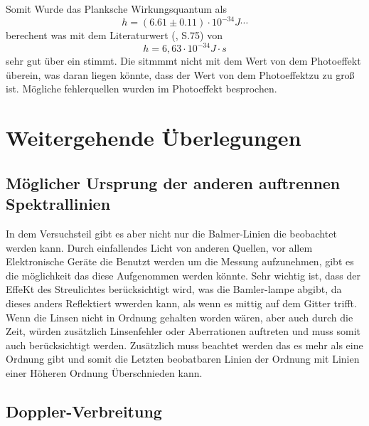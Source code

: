 Somit Wurde das Planksche Wirkungsquantum als
\begin{equation}
    h = (6.61 \pm 0.11)\cdot 10^{-34} J\cdots
\end{equation}
berechent was mit dem Literaturwert (\cite{Demtröder_Ex3}, S.75) von
\begin{equation}
    h = 6,63 \cdot10^{-34} J\cdot s
\end{equation}
sehr gut über ein stimmt.
Die sitmmmt nicht mit dem Wert von dem Photoeffekt überein, was daran liegen könnte, dass der Wert von dem Photoeffektzu zu groß ist.
Mögliche fehlerquellen wurden im Photoeffekt besprochen.


\section{Weitergehende Überlegungen}
\subsection{Möglicher Ursprung der anderen auftrennen Spektrallinien}
In dem Versuchsteil gibt es aber nicht nur die Balmer-Linien die beobachtet werden kann. 
Durch einfallendes Licht von anderen Quellen, vor allem Elektronische Geräte die Benutzt werden um die Messung aufzunehmen, gibt es die möglichkeit das diese Aufgenommen werden könnte.
Sehr wichtig ist, dass der EffeKt des Streulichtes berücksichtigt wird, was die Bamler-lampe abgibt, da dieses anders Reflektiert wwerden kann, als wenn es mittig auf dem Gitter trifft.
Wenn die Linsen nicht in Ordnung gehalten worden wären, aber auch durch die Zeit, würden zusätzlich Linsenfehler oder Aberrationen auftreten und muss somit auch berücksichtigt werden. 
Zusätzlich muss beachtet werden das es mehr als eine Ordnung gibt und somit die Letzten beobatbaren Linien der Ordnung mit Linien einer Höheren Ordnung Überschnieden kann.

\subsection{Doppler-Verbreitung}

